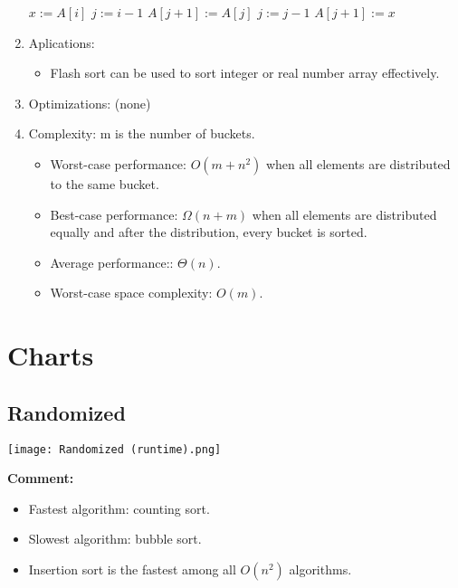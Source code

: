 \documentclass[12pt]{article}
\begin{document}
\begin{enumerate}
\begin{algorithm}[H]
\begin{algorithmic}[1]
                            \State $x:=A[i]$
                            \State $j:=i-1$
                                \State $A[j+1]:=A[j]$
                                \State $j:=j-1$
                            \EndWhile
                            \State $A[j+1]:=x$
                        \EndFor
                    \EndFor
                \EndFunction
            \end{algorithmic}
        \end{algorithm}
        \item Aplications:
        \begin{itemize}
            \item Flash sort can be used to sort integer or real number array effectively.
        \end{itemize}
        \item Optimizations: (none)
        \item Complexity: m is the number of buckets.
        \begin{itemize}
            \item Worst-case performance: $O(m+n^2)$ when all elements are distributed to the same bucket.
            \item Best-case performance: $\Omega(n+m)$ when all elements are distributed equally and after the distribution, every bucket is sorted.
            \item Average performance:: $\Theta(n)$.
            \item Worst-case space complexity: $O(m)$.
        \end{itemize}
    \end{enumerate}
\newpage

\newpage
\section{Charts}
\graphicspath{ {../chart\ picture} }

\subsection{Randomized}
\begin{center}
    \texttt{[image: Randomized (runtime).png]}
\end{center}
\textbf{Comment:}
\begin{itemize}
    \item Fastest algorithm: counting sort.
    \item Slowest algorithm: bubble sort.
    \item Insertion sort is the fastest among all $O(n^2)$ algorithms.
\end{itemize}
\end{document}
